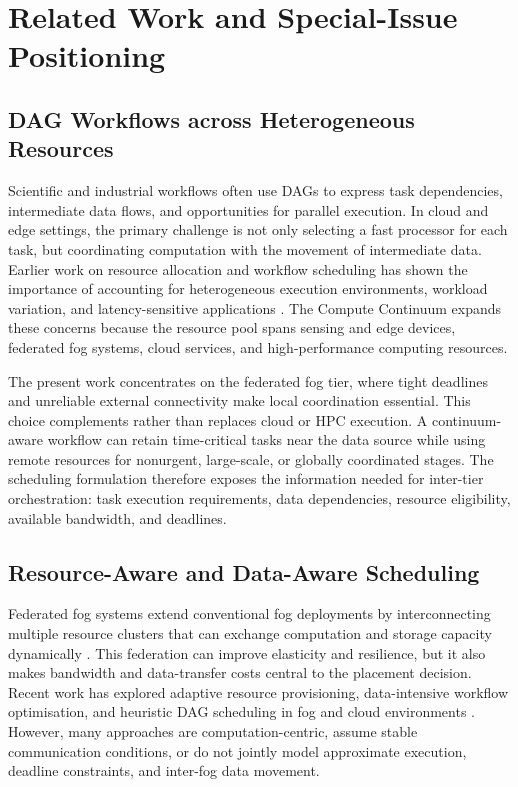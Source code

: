 \section{Related Work and Special-Issue Positioning}
\label{sec:related_work}

\subsection{DAG Workflows across Heterogeneous Resources}

Scientific and industrial workflows often use DAGs to express task dependencies, intermediate data flows, and opportunities for parallel execution. In cloud and edge settings, the primary challenge is not only selecting a fast processor for each task, but coordinating computation with the movement of intermediate data. Earlier work on resource allocation and workflow scheduling has shown the importance of accounting for heterogeneous execution environments, workload variation, and latency-sensitive applications \cite{wang2021adaptive,ahmad2014workflow,oluyisola2022dag}. The Compute Continuum expands these concerns because the resource pool spans sensing and edge devices, federated fog systems, cloud services, and high-performance computing resources.

The present work concentrates on the federated fog tier, where tight deadlines and unreliable external connectivity make local coordination essential. This choice complements rather than replaces cloud or HPC execution. A continuum-aware workflow can retain time-critical tasks near the data source while using remote resources for nonurgent, large-scale, or globally coordinated stages. The scheduling formulation therefore exposes the information needed for inter-tier orchestration: task execution requirements, data dependencies, resource eligibility, available bandwidth, and deadlines.

\subsection{Resource-Aware and Data-Aware Scheduling}

Federated fog systems extend conventional fog deployments by interconnecting multiple resource clusters that can exchange computation and storage capacity dynamically \cite{fgcs2024}. This federation can improve elasticity and resilience, but it also makes bandwidth and data-transfer costs central to the placement decision. Recent work has explored adaptive resource provisioning, data-intensive workflow optimisation, and heuristic DAG scheduling in fog and cloud environments \cite{ahmad2014workflow,oluyisola2022dag,ammar2022multicloud}. However, many approaches are computation-centric, assume stable communication conditions, or do not jointly model approximate execution, deadline constraints, and inter-fog data movement.

